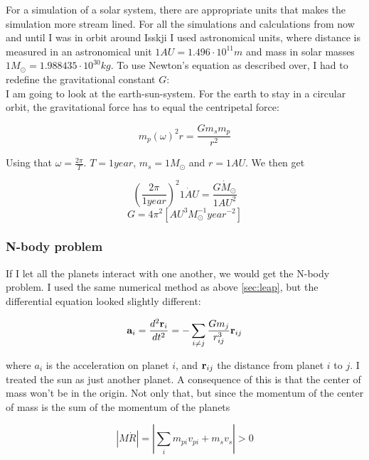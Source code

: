 \documentclass[a4paper, 10pt]{article}
\begin{document}
For a simulation of a solar system, there are appropriate units that makes the simulation more stream lined. For all the simulations and calculations from now and until I was in orbit around Isskji I used astronomical units, where distance is measured in an astronomical unit $1 AU = 1.496 \cdot 10^{11} m$ and mass in solar masses $1 M_{\odot} = 1.988435 \cdot 10^{30} kg$. To use Newton's equation as described over, I had to redefine the gravitational constant $G$: \\

I am going to look at the earth-sun-system. For the earth to stay in a circular orbit, the gravitational force has to equal the centripetal force:

\begin{equation}
m_p(\omega)^{2}r = \frac{Gm_sm_p}{r^{2}}
\end{equation}

Using that  $\omega = \frac{2 \pi}{T}$. $T = 1 year$, $m_s = 1 M_{\odot}$ and $r = 1 AU$. We then get

\begin{equation}
\left( \frac{2 \pi}{1 year} \right)^{2} \dot {1 AU} = \frac{G \dot M_{\odot}}{1AU^{2}} 
\end{equation}
\begin{equation}
G = 4 \pi^{2}[AU^{3} M_{\odot}^{-1} year^{-2}]
\end{equation}

\subsubsection{N-body problem}
If I let all the planets interact with one another, we would get the N-body problem. I used the same numerical method as above \ref{sec:leap}, but the differential equation looked slightly different:

\begin{align}
\bold{a}_i = \frac{d^{2}\textbf{r}_i}{dt^{2}}  = -\sum_{i \neq j}\frac{G m_j}{r_{ij}^{3}}\textbf{r}_{ij}
\end{align}

where $a_i$ is the acceleration on planet $i$, and $\bold{r}_{ij}$ the distance from planet $i$ to $j$. I treated the sun as just another planet. A consequence of this is that the center of mass won't be in the origin. Not only that, but since the momentum of the center of mass is the sum of the momentum of the planets 

\begin{equation}
|M\dot{R}| = |\sum\limits_i m_{pi}v_{pi} + m_sv_s| > 0 
\end{equation}
\end{document}
